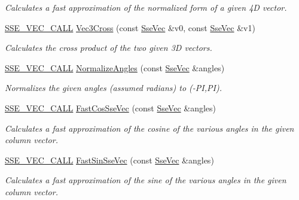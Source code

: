 \begin{DoxyCompactItemize}
\begin{DoxyCompactList}\small\item\em Calculates a fast approximation of the normalized form of a given 4\+D vector. \end{DoxyCompactList}\item 
\hyperlink{ssevec__math__defs_8h_a97454f977a5281455cecacce1e8ba670}{S\+S\+E\+\_\+\+V\+E\+C\+\_\+\+C\+A\+L\+L} \hyperlink{group___s_i_m_d_vec_math_ga69d9cb2d8b73743a44bdbd04ed2948bf}{Vec3\+Cross} (const \hyperlink{namespacegfxmath_a0de2243e2b8d0fd46d3af5e036423004}{Sse\+Vec} \&v0, const \hyperlink{namespacegfxmath_a0de2243e2b8d0fd46d3af5e036423004}{Sse\+Vec} \&v1)
\begin{DoxyCompactList}\small\item\em Calculates the cross product of the two given 3\+D vectors. \end{DoxyCompactList}\item 
\hyperlink{ssevec__math__defs_8h_a97454f977a5281455cecacce1e8ba670}{S\+S\+E\+\_\+\+V\+E\+C\+\_\+\+C\+A\+L\+L} \hyperlink{group___s_i_m_d_vec_math_ga23869cd4461571a7546b726f0964d1fc}{Normalize\+Angles} (const \hyperlink{namespacegfxmath_a0de2243e2b8d0fd46d3af5e036423004}{Sse\+Vec} \&angles)
\begin{DoxyCompactList}\small\item\em Normalizes the given angles (assumed radians) to (-\/\+P\+I,P\+I). \end{DoxyCompactList}\item 
\hyperlink{ssevec__math__defs_8h_a97454f977a5281455cecacce1e8ba670}{S\+S\+E\+\_\+\+V\+E\+C\+\_\+\+C\+A\+L\+L} \hyperlink{group___s_i_m_d_vec_math_ga9805d851a980ead20c3c7354c6273b6c}{Fast\+Cos\+Sse\+Vec} (const \hyperlink{namespacegfxmath_a0de2243e2b8d0fd46d3af5e036423004}{Sse\+Vec} \&angles)
\begin{DoxyCompactList}\small\item\em Calculates a fast approximation of the cosine of the various angles in the given column vector. \end{DoxyCompactList}\item 
\hyperlink{ssevec__math__defs_8h_a97454f977a5281455cecacce1e8ba670}{S\+S\+E\+\_\+\+V\+E\+C\+\_\+\+C\+A\+L\+L} \hyperlink{group___s_i_m_d_vec_math_ga78af7175bfbeef26471a5252fba86949}{Fast\+Sin\+Sse\+Vec} (const \hyperlink{namespacegfxmath_a0de2243e2b8d0fd46d3af5e036423004}{Sse\+Vec} \&angles)
\begin{DoxyCompactList}\small\item\em Calculates a fast approximation of the sine of the various angles in the given column vector. \end{DoxyCompactList}\item 

\end{DoxyCompactItemize}
